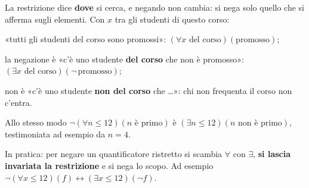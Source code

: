 \begin{spiegazione}
    La restrizione dice \textbf{dove} si cerca, e negando non cambia: si nega solo quello che si afferma sugli elementi. Con $x$ tra gli studenti
    di questo corso:
    \begin{passi}
        \item «tutti gli studenti del corso sono promossi»: $(\forall x \text{ del corso})(\text{promosso})$;
        \item la negazione è «c'è uno studente \textbf{del corso} che non è promosso»: $(\exists x \text{ del corso})(\neg\,\text{promosso})$;
        \item non è «c'è uno studente \textbf{non del corso} che \dots»: chi non frequenta il corso non c'entra.
    \end{passi}
    Allo stesso modo $\neg(\forall n \leq 12)(n \text{ è primo})$ è $(\exists n \leq 12)(n \text{ non è primo})$, testimoniata ad esempio da $n = 4$.
\end{spiegazione}


In pratica: per negare un quantificatore ristretto si scambia $\forall$ con $\exists$, \textbf{si lascia invariata la restrizione}
e si nega lo scopo. Ad esempio $\neg(\forall x \leq 12)(f) \leftrightarrow (\exists x \leq 12)(\neg f)$.
